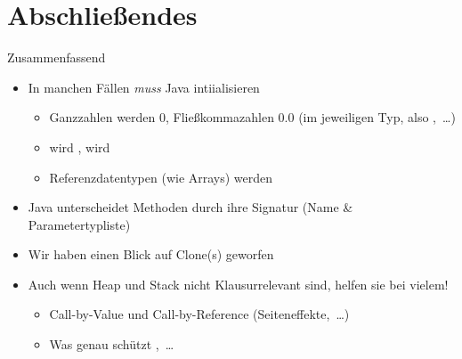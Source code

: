 \fi


\section{Abschließendes}
{\SummaryFrame
\begin{frame}[t]{Zusammenfassend}
\pause \printBibCommand
\vfill\vfill %
\begin{itemize}[<+(1)->]
    \itemsep6.5pt
    \item In manchen Fällen \textit{muss} Java intiialisieren  \begin{itemize}
        \item Ganzzahlen werden \(0\), Fließkommazahlen \(0.0\) (im jeweiligen Typ, also ,~\ldots)
        \item {} wird ,  wird  
        \item Referenzdatentypen (wie Arrays) werden 
    \end{itemize}
    \item Java unterscheidet Methoden durch ihre Signatur (Name \& Parametertypliste)
    \item Wir haben einen Blick auf Clone(s) geworfen 
    \item Auch wenn Heap und Stack nicht Klausurrelevant sind, helfen sie bei vielem! \begin{itemize}
        \item Call-by-Value und Call-by-Reference (Seiteneffekte,~\ldots)
        \item Was genau schützt ,~\ldots
    \end{itemize}
\end{itemize}
\end{frame}
}



\iffull\fi
